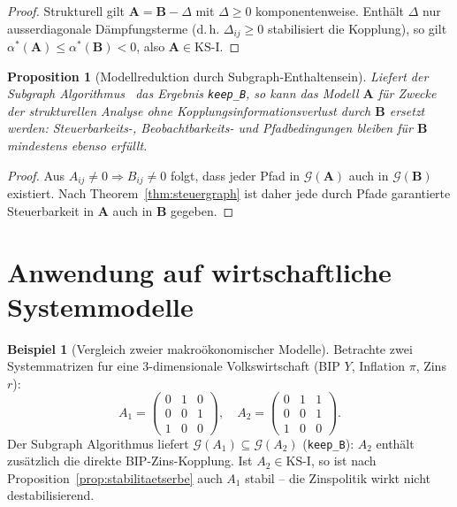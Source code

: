 ﻿\documentclass[12pt, a4paper, titlepage]{report}
\newtheorem{proposition}[theorem]{Proposition}
\theoremstyle{definition}
\newtheorem{example}[theorem]{Beispiel}
\theoremstyle{remark}
\newcommand{\vA}{\bm{A}}
\newcommand{\vB}{\bm{B}}
\newcommand{\KS}{\mathrm{KS}}
\begin{document}
\begin{proof}
Strukturell gilt $\vA = \vB - \Delta$ mit $\Delta \geq 0$ komponentenweise.
Enthält $\Delta$ nur ausserdiagonale Dämpfungsterme (d.\,h. $\Delta_{ij} \geq 0$
stabilisiert die Kopplung), so gilt $\alpha^*(\vA) \leq \alpha^*(\vB) < 0$, also $\vA \in \KS\text{-I}$.
\end{proof}

\begin{proposition}[Modellreduktion durch Subgraph-Enthaltensein]
\label{prop:modellreduktion}
Liefert der Subgraph Algorithmus~\citep{epp2026subgraph} das Ergebnis \texttt{keep\_B},
so kann das Modell $\vA$ für Zwecke der strukturellen Analyse ohne
Kopplungsinformationsverlust durch $\vB$ ersetzt werden: Steuerbarkeits-,
Beobachtbarkeits- und Pfadbedingungen bleiben für $\vB$ mindestens ebenso erfüllt.
\end{proposition}

\begin{proof}
Aus $A_{ij} \neq 0 \Rightarrow B_{ij} \neq 0$ folgt, dass jeder Pfad in
$\mathcal{G}(\vA)$ auch in $\mathcal{G}(\vB)$ existiert. Nach
Theorem~\ref{thm:steuergraph} ist daher jede durch Pfade garantierte Steuerbarkeit
in $\vA$ auch in $\vB$ gegeben.
\end{proof}

\section{Anwendung auf wirtschaftliche Systemmodelle}

\begin{example}[Vergleich zweier makroökonomischer Modelle]
Betrachte zwei Systemmatrizen fur eine 3-dimensionale Volkswirtschaft
(BIP $Y$, Inflation $\pi$, Zins $r$):
\[
  A_1 = \begin{pmatrix} 0 & 1 & 0 \\ 0 & 0 & 1 \\ 1 & 0 & 0 \end{pmatrix},
  \quad
  A_2 = \begin{pmatrix} 0 & 1 & 1 \\ 0 & 0 & 1 \\ 1 & 0 & 0 \end{pmatrix}.
\]
Der Subgraph Algorithmus liefert $\mathcal{G}(A_1) \subseteq \mathcal{G}(A_2)$
(\texttt{keep\_B}): $A_2$ enthält zusätzlich die direkte BIP-Zins-Kopplung.
Ist $A_2 \in \KS\text{-I}$, so ist nach Proposition~\ref{prop:stabilitaetserbe}
auch $A_1$ stabil -- die Zinspolitik wirkt nicht destabilisierend.
\end{example}
\end{document}
